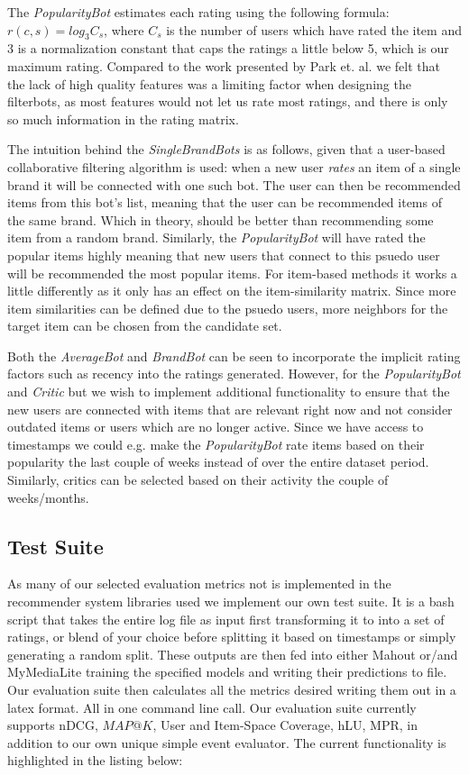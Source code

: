 The \emph{PopularityBot} estimates each rating using the following formula: $r(c,s) = log_{3}C_{s}$, where $C_{s}$ is the number of users which have rated the item and $3$ is a normalization constant that caps the ratings a little below 5, which is our maximum rating.
Compared to the work presented by Park et. al. we felt that the lack of high quality features was a limiting factor when designing the filterbots, as most features would not let us rate most ratings, and there is only so much information in the rating matrix.

The intuition behind the \emph{SingleBrandBots} is as follows, given that a user-based collaborative filtering algorithm is used:
when a new user \emph{rates} an item of a single brand it will be connected with one such bot. The user can then be recommended
items from this bot's list, meaning that the user can be recommended items of the same brand. Which in theory, should be better
than recommending some item from a random brand. Similarly, the \emph{PopularityBot}
will have rated the popular items highly meaning that new users that connect to this psuedo user will be recommended the
most popular items. For item-based methods it works a little differently as it only has an effect on the item-similarity matrix.
Since more item similarities can be defined due to the psuedo users, more neighbors for the target item can be chosen from the candidate set.

Both the \emph{AverageBot} and \emph{BrandBot} can be seen to incorporate the implicit rating factors such as recency into
the ratings generated. However, for the \emph{PopularityBot} and \emph{Critic} but we wish to implement additional functionality to ensure
that the new users are connected with items that are relevant right now and not consider outdated items or users which
are no longer active. Since we have access to timestamps we could e.g. make the \emph{PopularityBot} rate items based on
their popularity the last couple of weeks instead of over the entire dataset period. Similarly, critics can be selected
based on their activity the couple of weeks/months.

\subsection{Test Suite}

As many of our selected evaluation metrics not is implemented in the recommender system libraries used we implement our own test suite. It is a bash
script that takes the entire log file as input first transforming it to into a set of ratings, or blend of your choice before splitting it based on timestamps
or simply generating a random split. These outputs are then fed into either Mahout or/and MyMediaLite training the specified models and writing their predictions to file. Our evaluation suite then calculates all the metrics desired writing them out in a latex format. All in one command line call. Our evaluation suite currently supports nDCG, $MAP@K$, User and Item-Space Coverage, hLU, MPR, in addition to our own unique simple event evaluator. The current functionality is
highlighted in the listing below:

